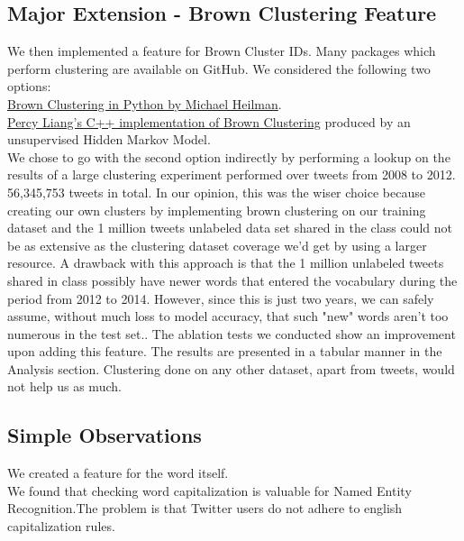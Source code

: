 \documentclass[a4paper]{article}
\begin{document}
\subsection{Major Extension - Brown Clustering Feature}

We then implemented a feature for Brown Cluster IDs. Many packages which perform clustering are available on GitHub. We considered the following two options: \\

\href{https://github.com/mheilman/tan-clustering.git}{Brown Clustering in Python by Michael Heilman}.\\

\href{https://github.com/percyliang/brown-cluster.git}{Percy Liang's C++ implementation of Brown Clustering} produced by an unsupervised Hidden Markov Model.\\

We chose to go with the second option indirectly by performing a lookup on the results of a large clustering experiment performed over tweets from 2008 to 2012. 56,345,753 tweets in total. In our opinion, this was the wiser choice because creating our own clusters by implementing brown clustering on our training dataset and the 1 million tweets unlabeled data set shared in the class could not be as extensive as the clustering dataset coverage we'd get by using a larger resource. \cite{50mpaths} A drawback with this approach is that the 1 million unlabeled tweets shared in class possibly have newer words that entered the vocabulary during the period from 2012 to 2014. However, since this is just two years, we can safely assume, without much loss to model accuracy, that such "new" words aren't too numerous in the test set.\cite{gimpel2011part}. The ablation tests we conducted show an improvement upon adding this feature. The results are presented in a tabular manner in the Analysis section. Clustering done on any other dataset, apart from tweets, would not help us as much.  

\subsection{Simple Observations}

We created a feature for the word itself. \\

We found that checking word capitalization is valuable for Named Entity Recognition.The problem is that Twitter users do not adhere to english capitalization rules. \\
\end{document}

